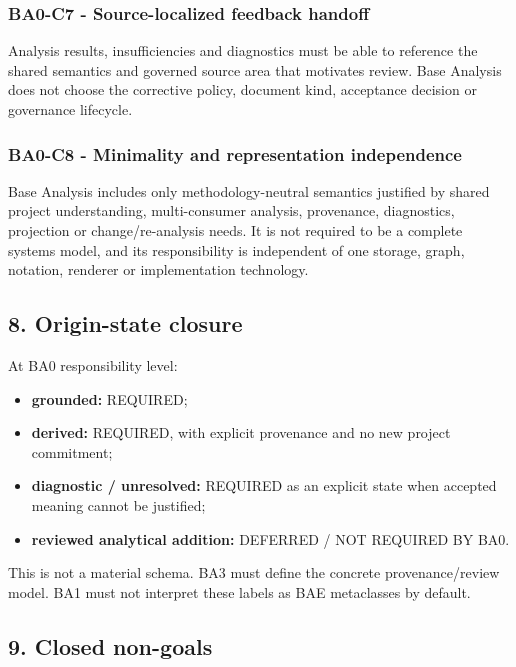 \documentclass[
  10pt,
]{article}
\providecommand{\tightlist}{%
  \setlength{\itemsep}{0pt}\setlength{\parskip}{0pt}}
\begin{document}
\subsubsection{BA0-C7 - Source-localized feedback
handoff}\label{ba0-c7---source-localized-feedback-handoff}

Analysis results, insufficiencies and diagnostics must be able to
reference the shared semantics and governed source area that motivates
review. Base Analysis does not choose the corrective policy, document
kind, acceptance decision or governance lifecycle.

\subsubsection{BA0-C8 - Minimality and representation
independence}\label{ba0-c8---minimality-and-representation-independence}

Base Analysis includes only methodology-neutral semantics justified by
shared project understanding, multi-consumer analysis, provenance,
diagnostics, projection or change/re-analysis needs. It is not required
to be a complete systems model, and its responsibility is independent of
one storage, graph, notation, renderer or implementation technology.

\subsection{8. Origin-state closure}\label{origin-state-closure}

At BA0 responsibility level:

\begin{itemize}
\tightlist
\item
  \textbf{grounded:} REQUIRED;
\item
  \textbf{derived:} REQUIRED, with explicit provenance and no new
  project commitment;
\item
  \textbf{diagnostic / unresolved:} REQUIRED as an explicit state when
  accepted meaning cannot be justified;
\item
  \textbf{reviewed analytical addition:} DEFERRED / NOT REQUIRED BY BA0.
\end{itemize}

This is not a material schema. BA3 must define the concrete
provenance/review model. BA1 must not interpret these labels as BAE
metaclasses by default.

\subsection{9. Closed non-goals}\label{closed-non-goals}
\end{document}
